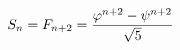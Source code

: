 \documentclass[preview]{standalone}
\begin{document}
\begin{align*}
\special{dvisvgm:raw <g id='unique000'>}S_n = F_{n+2} = \frac{\varphi^{n+2} - \psi^{n+2}}{\sqrt{5}}\special{dvisvgm:raw </g>}
\end{align*}
\end{document}

